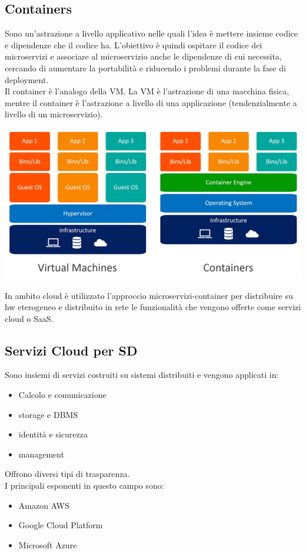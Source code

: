 \subsection{Containers}
Sono un'astrazione a livello applicativo nelle quali l'idea è mettere insieme codice e dipendenze che il codice ha. L'obiettivo è quindi ospitare il codice dei microservizi e associare al microservizio anche le dipendenze di cui necessita, cercando di aumentare la portabilità e riducendo i problemi durante la fase di deployment. \\
Il container è l'analogo della VM. La VM è l'astrazione di una macchina fisica, mentre il container è l'astrazione a livello di una applicazione (tendenzialmente a livello di un microservizio).
\begin{center}
    \includegraphics[width = .7\textwidth]{images/lezione2/containers-vs-virtual-machines.jpeg}
\end{center}
In ambito cloud è utilizzato l'approccio microservizi-container per distribuire su hw eterogeneo e distribuito in rete le funzionalità che vengono offerte come servizi cloud o SaaS. 


\subsection{Servizi Cloud per SD}
Sono insiemi di servizi costruiti su sistemi distribuiti e vengono applicati in:
\begin{itemize}
    \item Calcolo e comunicazione
    \item storage e DBMS
    \item identità e sicurezza
    \item management
\end{itemize}
Offrono diversi tipi di trasparenza.\\
I principali esponenti in questo campo sono:
\begin{itemize}
    \item Amazon AWS
    \item Google Cloud Platform
    \item Microsoft Azure
\end{itemize}

